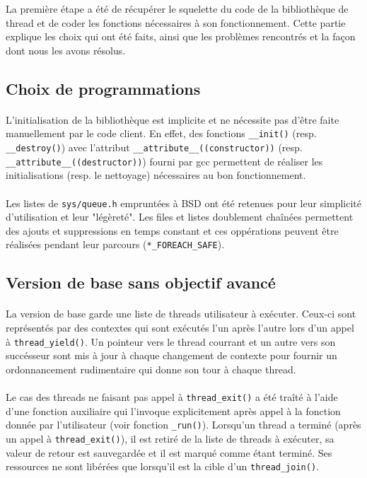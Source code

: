 La première étape a été de récupérer le squelette du code de la bibliothèque de thread et de coder les fonctions nécessaires à son fonctionnement. Cette partie explique les choix qui ont été faits, ainsi que les problèmes rencontrés et la façon dont nous les avons résolus.

\subsection{Choix de programmations}

\paragraph{} L'initialisation de la bibliothèque est implicite et ne nécessite
pas d'être faite manuellement par le code client. En effet, des fonctions
\verb!__init()!  (resp. \verb!__destroy()!) avec l'attribut
\verb!__attribute__((constructor))!  (resp.
\verb!__attribute__((destructor))!) fourni par gcc permettent de réaliser les
initialisations (resp. le nettoyage) nécessaires au bon fonctionnement.

\paragraph{} Les listes de \verb!sys/queue.h! empruntées à BSD ont été
retenues pour leur simplicité d'utilisation et leur "légèreté". Les files et
listes doublement chaînées permettent des ajouts et suppressions en temps
constant et ces oppérations peuvent être réalisées pendant leur parcours
(\verb!*_FOREACH_SAFE!).


\subsection{Version de base sans objectif avancé}

\paragraph{} La version de base garde une liste de threads utilisateur à exécuter. Ceux-ci sont représentés par des contextes qui sont exécutés l'un après l'autre lors d'un appel à \verb!thread_yield()!. Un pointeur vers le thread courrant et un autre vers son succésseur sont mis à jour à chaque changement de contexte pour fournir un ordonnancement rudimentaire qui donne son tour à chaque thread.

\paragraph{} Le cas des threads ne faisant pas appel à \verb!thread_exit()! a été traîté à l'aide d'une fonction auxiliaire qui l'invoque explicitement après appel à la fonction donnée par l'utilisateur (voir fonction \verb!_run()!). Lorsqu'un thread a terminé (après un appel à \verb!thread_exit()!), il est retiré de la liste de threads à exécuter, sa valeur de retour est sauvegardée et il est marqué comme étant terminé. Ses ressources ne sont libérées que lorsqu'il est la cible d'un \verb!thread_join()!.
